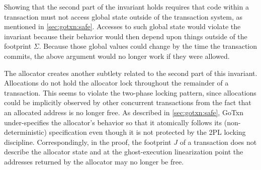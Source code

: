 Showing that the second part of the invariant holds requires that code within a
transaction must not access global state outside of the
transaction system, as mentioned in \cref{sec:gotxn:safe}. Accesses to such global state
would violate the invariant because their behavior would then depend upon
things outside of the footprint $\Sigma$. Because those global values could change
by the time the transaction commits, the above argument would no longer work if they were allowed.

The allocator creates another subtlety related to the second part of this
invariant. Allocations do not hold the allocator lock throughout the remainder
of a transaction. This seems to violate the two-phase locking pattern, since
allocations could be implicitly observed by other concurrent transactions from
the fact that an allocated address is no longer free. As described in
\cref{sec:gotxn:safe}, GoTxn under-specifies the allocator's behavior so that it
atomically follows its (non-deterministic) specification even though it is not
protected by the 2PL locking discipline. Correspondingly, in the
proof, the footprint $J$ of a transaction does not describe the allocator state
and at the ghost-execution linearization point the addresses returned by the
allocator may no longer be free.


